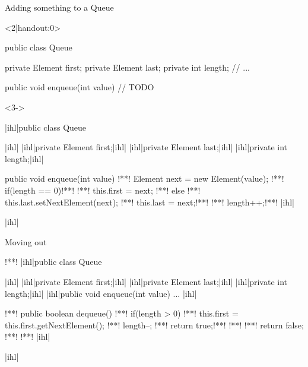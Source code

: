 \begin{frame}[c,fragile]{Adding something to a Queue}
\SetupLstHl
\begin{onlyenv}<2|handout:0>
\begin{plainjava}
public class Queue {
    private Element first;
    private Element last;
    private int length;
    // ...

    public void enqueue(int value) {
        // TODO
    }
}
\end{plainjava}
\end{onlyenv}
\begin{onlyenv}<3->
    \begin{plainjava}
|ihl|public class Queue {|ihl|
    |ihl|private Element first;|ihl|
    |ihl|private Element last;|ihl|
    |ihl|private int length;|ihl|

    public void enqueue(int value) {
!**!        Element next = new Element(value);
!**!        if(length == 0)!**!
!**!            this.first = next;
!**!        else
!**!            this.last.setNextElement(next);
!**!        this.last = next;!**!
!**!        length++;!**!
    }
|ihl|}|ihl|
\end{plainjava}
\end{onlyenv}
\end{frame}

\begin{frame}[c,fragile]{Moving out}
\SetupLstHl
\begin{plainjava}
!**!
|ihl|public class Queue {|ihl|
    |ihl|private Element first;|ihl|
    |ihl|private Element last;|ihl|
    |ihl|private int length;|ihl|
    |ihl|public void enqueue(int value) { ... }|ihl|

!**!    public boolean dequeue() {
!**!        if(length > 0) {
!**!            this.first = this.first.getNextElement();
!**!            length--;
!**!            return true;!**!
!**!        }
!**!        return false;
!**!    }!**!
|ihl|}|ihl|
\end{plainjava}
\end{frame}

